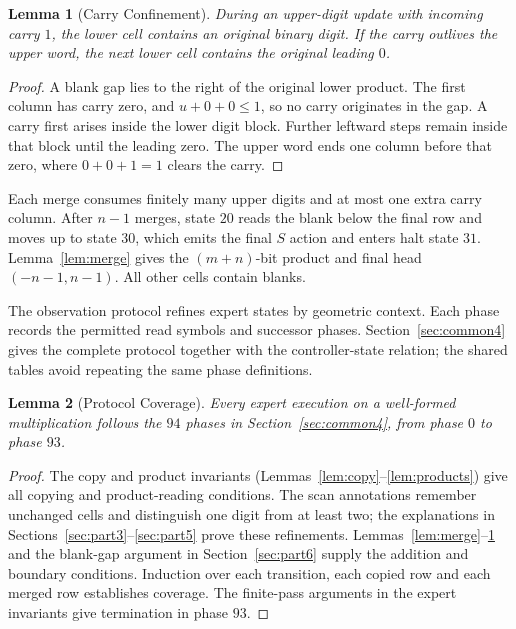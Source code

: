 \documentclass[11pt,a4paper]{article}
\newtheorem{lemma}{Lemma}
\newcommand{\sectiontitle}[2]{\refstepcounter{section}\vspace*{2pt}{\LARGE\bfseries\color{Teal}\thesection\quad #2}\par\vspace{7pt}}
\begin{document}
\begin{lemma}[Carry Confinement]\label{lem:carry}
During an upper-digit update with incoming carry $1$, the lower cell
contains an original binary digit. If the carry outlives the upper word,
the next lower cell contains the original leading $0$.
\end{lemma}
\begin{proof}
A blank gap lies to the right of the original lower product. The first
column has carry zero, and $u+0+0\le1$, so no carry originates in the gap.
A carry first arises inside the lower digit block. Further leftward steps
remain inside that block until the leading zero. The upper word ends one
column before that zero, where $0+0+1=1$ clears the carry.
\end{proof}

Each merge consumes finitely many upper digits and at most one extra carry
column. After $n-1$ merges, state $20$ reads the blank below the final row
and moves up to state $30$, which emits the final $S$ action and enters halt
state $31$. Lemma~\ref{lem:merge} gives the $(m+n)$-bit product and final head
$(-n-1,n-1)$. All other cells contain blanks.

\clearpage
\sectiontitle{3 \enspace OBSERVATION PROTOCOL}{Observation Protocol}\label{sec:common3}
The observation protocol refines expert states by geometric context. Each phase records the permitted read symbols and successor phases. Section~\ref{sec:common4} gives the complete protocol together with the controller-state relation; the shared tables avoid repeating the same phase definitions.

\begin{lemma}[Protocol Coverage]\label{lem:coverage}
Every expert execution on a well-formed multiplication follows the
$94$ phases in Section~\ref{sec:common4}, from phase $0$ to phase $93$.
\end{lemma}
\begin{proof}
The copy and product invariants (Lemmas~\ref{lem:copy}--\ref{lem:products})
give all copying and product-reading conditions. The scan annotations
remember unchanged cells and distinguish one digit from at least two;
the explanations in Sections~\ref{sec:part3}--\ref{sec:part5} prove these refinements.
Lemmas~\ref{lem:merge}--\ref{lem:carry} and the blank-gap argument in
Section~\ref{sec:part6} supply the addition and boundary conditions. Induction over
each transition, each copied row and each merged row establishes coverage.
The finite-pass arguments in the expert invariants give termination in phase $93$.
\end{proof}
\end{document}
